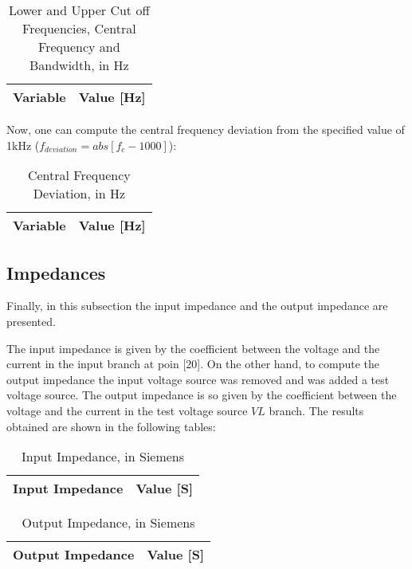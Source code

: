 \begin{table}[H]
  \centering
  \begin{tabular}{|l|r|}
    \hline    
    {\bf Variable} & {\bf Value [Hz]} \\ \hline
    
  \end{tabular}
  \caption{Lower and Upper Cut off Frequencies, Central Frequency and Bandwidth, in Hz}
  \label{tab:frequencies}
\end{table}

Now, one can compute the central frequency deviation from the specified value of 1kHz ($f_{deviation}=abs[f_c-1000]$):

\begin{table}[H]
  \centering
  \begin{tabular}{|l|r|}
    \hline    
    {\bf Variable} & {\bf Value [Hz]} \\ \hline
    
  \end{tabular}
  \caption{Central Frequency Deviation, in Hz}
  \label{tab:frequency_dev}
\end{table}


\subsection{Impedances}
\label{impedances}
\par Finally, in this subsection the input impedance and the output impedance are presented.
\par The input impedance is given by the coefficient between the voltage and the current in the input branch at poin [20]. On the other hand, to compute the output impedance the input voltage source was removed and was added a test voltage source. The output impedance is so given by the coefficient between the voltage and the current in the test voltage source $VL$ branch. The results obtained are shown in the following tables:

\begin{table}[H]
  \centering
  \begin{tabular}{|l|r|}
    \hline    
    {\bf Input Impedance} & {\bf Value [S]} \\ \hline
    
  \end{tabular}
  \caption{Input Impedance, in Siemens}
  \label{tab:input_z}
\end{table}


\begin{table}[H]
  \centering
  \begin{tabular}{|l|r|}
    \hline    
    {\bf Output Impedance} & {\bf Value [S]} \\ \hline
    
  \end{tabular}
  \caption{Output Impedance, in Siemens}
  \label{tab:output_z}
\end{table}






